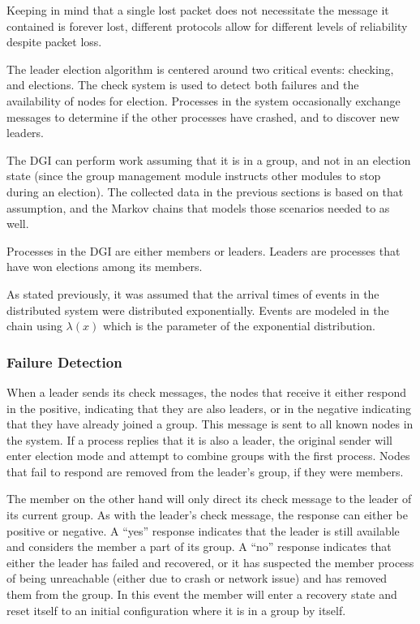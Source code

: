 Keeping in mind that a single lost packet does not necessitate the message it contained is forever lost, different protocols allow for different levels of reliability despite packet loss.

The leader election algorithm is centered around two critical events: checking, and elections. The check system is used to detect both failures and the availability of nodes for election. Processes in the system occasionally exchange messages to determine if the other processes have crashed, and to discover new leaders.

The DGI can perform work assuming that it is in a group, and not in an election state (since the group management module instructs other modules to stop during an election). The collected data in the previous sections is based on that assumption, and the Markov chains that models those scenarios needed to as well.

Processes in the DGI are either members or leaders. Leaders are processes that have won elections among its members.

As stated previously, it was assumed that the arrival times of events in the distributed system were distributed exponentially. Events are modeled in the chain using $\lambda(x)$ which is the parameter of the exponential distribution. 

\subsubsection{Failure Detection}
When a leader sends its check messages, the nodes that receive it either respond in the positive, indicating that they are also leaders, or in the negative indicating that they have already joined a group. This message is sent to all known nodes in the system. If a process replies that it is also a leader, the original sender will enter election mode and attempt to combine groups with the first process. Nodes that fail to respond are removed from the leader's group, if they were members.

The member on the other hand will only direct its check message to the leader of its current group. As with the leader's check message, the response can either be positive or negative. A ``yes'' response indicates that the leader is still available and considers the member a part of its group. A ``no'' response indicates that either the leader has failed and recovered, or it has suspected the member process of being unreachable (either due to crash or network issue) and has removed them from the group. In this event the member will enter a recovery state and reset itself to an initial configuration where it is in a group by itself.

